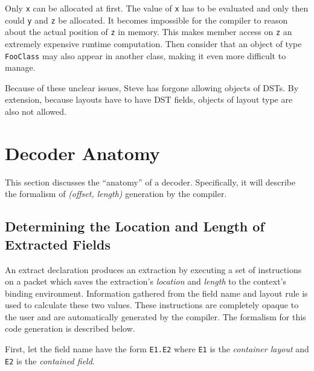 Only \texttt{x} can be allocated at first. The value of \texttt{x} has to be evaluated
and only then could \texttt{y} and \texttt{z} be allocated. It becomes impossible
for the compiler to reason about the actual position of \texttt{z} in memory. This
makes member access on \texttt{z} an extremely expensive runtime computation.
Then consider that an object of type \texttt{FooClass} may also appear in
another class, making it even more difficult to manage.

Because of these unclear issues, Steve has forgone allowing objects of DSTs.
By extension, because layouts have to have DST fields, objects of layout type
are also not allowed.


\section{Decoder Anatomy} \label{decoder_anatomy}

This section discusses the ``anatomy'' of a decoder.
Specifically, it will describe the formalism of \textit{(offset, length)} generation by the compiler.

\subsection{Determining the Location and Length of Extracted Fields}

An extract declaration produces an extraction by executing a set of instructions on a packet which saves the extraction's \textit{location} and \textit{length} to the context's binding environment. Information gathered from the field name and layout rule is used to calculate these two values. These instructions are completely opaque to the user and are automatically generated by the compiler. The formalism for this code generation is described below.

First, let the field name have the form \texttt{E1.E2} where \texttt{E1} is the \textit{container layout} and \texttt{E2} is the \textit{contained field}.

